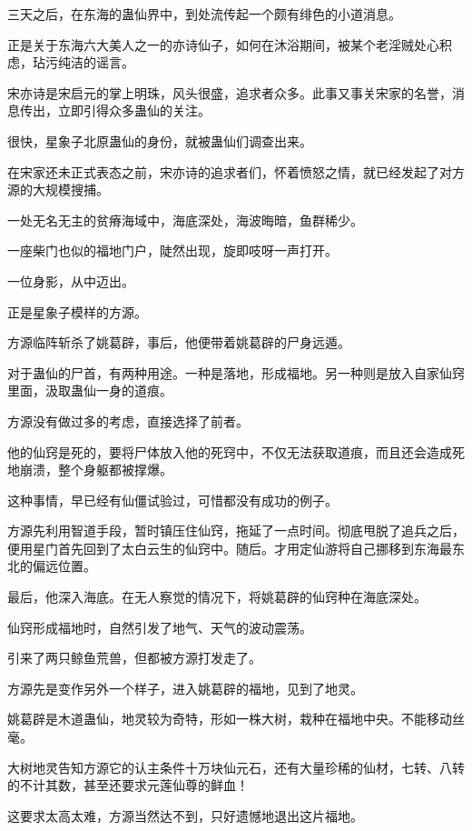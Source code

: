 
\begin{this_body}

三天之后，在东海的蛊仙界中，到处流传起一个颇有绯色的小道消息。

正是关于东海六大美人之一的亦诗仙子，如何在沐浴期间，被某个老淫贼处心积虑，玷污纯洁的谣言。

宋亦诗是宋启元的掌上明珠，风头很盛，追求者众多。此事又事关宋家的名誉，消息传出，立即引得众多蛊仙的关注。

很快，星象子北原蛊仙的身份，就被蛊仙们调查出来。

在宋家还未正式表态之前，宋亦诗的追求者们，怀着愤怒之情，就已经发起了对方源的大规模搜捕。

一处无名无主的贫瘠海域中，海底深处，海波晦暗，鱼群稀少。

一座柴门也似的福地门户，陡然出现，旋即吱呀一声打开。

一位身影，从中迈出。

正是星象子模样的方源。

方源临阵斩杀了姚葛辟，事后，他便带着姚葛辟的尸身远遁。

对于蛊仙的尸首，有两种用途。一种是落地，形成福地。另一种则是放入自家仙窍里面，汲取蛊仙一身的道痕。

方源没有做过多的考虑，直接选择了前者。

他的仙窍是死的，要将尸体放入他的死窍中，不仅无法获取道痕，而且还会造成死地崩溃，整个身躯都被撑爆。

这种事情，早已经有仙僵试验过，可惜都没有成功的例子。

方源先利用智道手段，暂时镇压住仙窍，拖延了一点时间。彻底甩脱了追兵之后，便用星门首先回到了太白云生的仙窍中。随后。才用定仙游将自己挪移到东海最东北的偏远位置。

最后，他深入海底。在无人察觉的情况下，将姚葛辟的仙窍种在海底深处。

仙窍形成福地时，自然引发了地气、天气的波动震荡。

引来了两只鲸鱼荒兽，但都被方源打发走了。

方源先是变作另外一个样子，进入姚葛辟的福地，见到了地灵。

姚葛辟是木道蛊仙，地灵较为奇特，形如一株大树，栽种在福地中央。不能移动丝毫。

大树地灵告知方源它的认主条件十万块仙元石，还有大量珍稀的仙材，七转、八转的不计其数，甚至还要求元莲仙尊的鲜血！

这要求太高太难，方源当然达不到，只好遗憾地退出这片福地。


\end{this_body}
